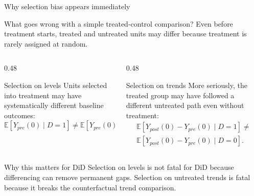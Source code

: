 \documentclass[10pt]{beamer}
\newcommand{\E}{\mathbb{E}}
\begin{document}
\begin{frame}{Why selection bias appears immediately}
\label{slide:did_selection}
\small
\begin{block}{What goes wrong with a simple treated-control comparison?}
Even before treatment starts, treated and untreated units may differ because treatment is rarely assigned at random.
\end{block}

\begin{columns}[T]
\begin{column}{0.48\textwidth}
\begin{exampleblock}{Selection on levels}
Units selected into treatment may have systematically different baseline outcomes:
\[
\E[Y_{pre}(0)\mid D=1]\neq \E[Y_{pre}(0)\mid D=0].
\]
\end{exampleblock}
\end{column}
\begin{column}{0.48\textwidth}
\begin{exampleblock}{Selection on trends}
More seriously, the treated group may have followed a different untreated path even without treatment:
\begin{align*} 
\E[Y_{post}(0)-Y_{pre}(0)\mid D=1]\neq \\ \E[Y_{post}(0)-Y_{pre}(0)\mid D=0].
\end{align*}
\end{exampleblock}
\end{column}
\end{columns}

\begin{alertblock}{Why this matters for DiD}
Selection on levels is not fatal for DiD because differencing can remove permanent gaps. Selection on untreated trends is fatal because it breaks the counterfactual trend comparison.
\end{alertblock}
\end{frame}
\end{document}
